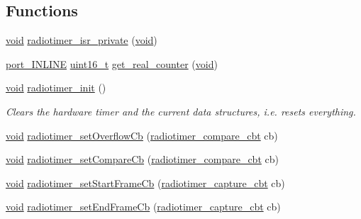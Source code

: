 \subsection*{Functions}
\begin{DoxyCompactItemize}
\item 
\hyperlink{usb__devapi_8h_afabf60e7f57651d6d595a02c75f07cd0}{void} \hyperlink{_open_mote-_c_c2538_2radiotimer_8c_a02bb26a2d1708895e21caa7bc6273064}{radiotimer\+\_\+isr\+\_\+private} (\hyperlink{usb__devapi_8h_afabf60e7f57651d6d595a02c75f07cd0}{void})
\item 
\hyperlink{toolchain__defs_8h_ac176b886c94b2cf591ec32600fb61a07}{port\+\_\+\+I\+N\+L\+I\+NE} \hyperlink{_p_e___types_8h_a1f1825b69244eb3ad2c7165ddc99c956}{uint16\+\_\+t} \hyperlink{_open_mote-_c_c2538_2radiotimer_8c_a5a42d3a684d5c36327d31b768ae9f00e}{get\+\_\+real\+\_\+counter} (\hyperlink{usb__devapi_8h_afabf60e7f57651d6d595a02c75f07cd0}{void})
\item 
\hyperlink{usb__devapi_8h_afabf60e7f57651d6d595a02c75f07cd0}{void} \hyperlink{group__radiotimer_ga9a5ab332f81d5e2a74143ad62ef6a2f7}{radiotimer\+\_\+init} ()
\begin{DoxyCompactList}\small\item\em Clears the hardware timer and the current data structures, i.\+e. resets everything. \end{DoxyCompactList}\item 
\hyperlink{usb__devapi_8h_afabf60e7f57651d6d595a02c75f07cd0}{void} \hyperlink{group__radiotimer_gab892e556a83f22551ff4e4551bd488f7}{radiotimer\+\_\+set\+Overflow\+Cb} (\hyperlink{group__radiotimer_ga62b602325e65023c91b784f20cd2d6bc}{radiotimer\+\_\+compare\+\_\+cbt} cb)
\item 
\hyperlink{usb__devapi_8h_afabf60e7f57651d6d595a02c75f07cd0}{void} \hyperlink{group__radiotimer_gaf4d7c5df5b6c28462c5104df496ae584}{radiotimer\+\_\+set\+Compare\+Cb} (\hyperlink{group__radiotimer_ga62b602325e65023c91b784f20cd2d6bc}{radiotimer\+\_\+compare\+\_\+cbt} cb)
\item 
\hyperlink{usb__devapi_8h_afabf60e7f57651d6d595a02c75f07cd0}{void} \hyperlink{group__radiotimer_gad6bae4a356aa6856a48dd247eea43f84}{radiotimer\+\_\+set\+Start\+Frame\+Cb} (\hyperlink{group__radiotimer_gac7da641d0774aa21bfabefd560e42acf}{radiotimer\+\_\+capture\+\_\+cbt} cb)
\item 
\hyperlink{usb__devapi_8h_afabf60e7f57651d6d595a02c75f07cd0}{void} \hyperlink{group__radiotimer_ga54531cf0f173f07f760d24aeacbc6fe3}{radiotimer\+\_\+set\+End\+Frame\+Cb} (\hyperlink{group__radiotimer_gac7da641d0774aa21bfabefd560e42acf}{radiotimer\+\_\+capture\+\_\+cbt} cb)

\end{DoxyCompactItemize}
